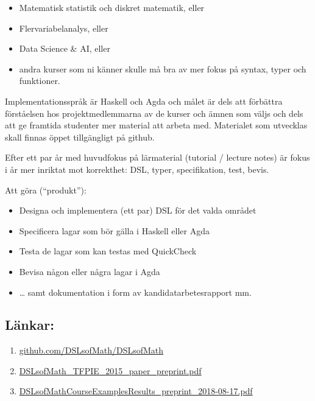 \documentclass{article}
\providecommand{\tightlist}{%
  \setlength{\itemsep}{0pt}\setlength{\parskip}{0pt}}
\begin{document}
\begin{itemize}
\tightlist
\item
  Matematisk statistik och diskret matematik, eller
\item
  Flervariabelanalys, eller
\item
  Data Science \& AI, eller
\item
  andra kurser som ni känner skulle må bra av mer fokus på syntax, typer
  och funktioner.
\end{itemize}

Implementationsspråk är Haskell och Agda och målet är dels att förbättra
förståelsen hos projektmedlemmarna av de kurser och ämnen som väljs och
dels att ge framtida studenter mer material att arbeta med. Materialet
som utvecklas skall finnas öppet tillgängligt på github.

Efter ett par år med huvudfokus på lärmaterial (tutorial / lecture
notes) är fokus i år mer inriktat mot korrekthet: DSL, typer,
specifikation, test, bevis.

Att göra (``produkt''):

\begin{itemize}
\tightlist
\item
  Designa och implementera (ett par) DSL för det valda området
\item
  Specificera lagar som bör gälla i Haskell eller Agda
\item
  Testa de lagar som kan testas med QuickCheck
\item
  Bevisa någon eller några lagar i Agda
\item
  \ldots{} samt dokumentation i form av kandidatarbetesrapport mm.
\end{itemize}

\subsection{Länkar:}\label{luxe4nkar}

\begin{enumerate}
\def\labelenumi{\arabic{enumi}.}
\tightlist
\item \href{https://github.com/DSLsofMath/DSLsofMath}{github.com/DSLsofMath/DSLsofMath}
\item \href{https://www.cse.chalmers.se/~patrikj/papers/Ionescu_Jansson_DSLsofMath_TFPIE_2015_paper_preprint.pdf}{DSLsofMath\_TFPIE\_2015\_paper\_preprint.pdf}
\item \href{https://www.cse.chalmers.se/~patrikj/papers/Janssonetal_DSLsofMathCourseExamplesResults_preprint_2018-08-17.pdf}{DSLsofMathCourseExamplesResults\_preprint\_2018-08-17.pdf}
\end{enumerate}
\end{document}
